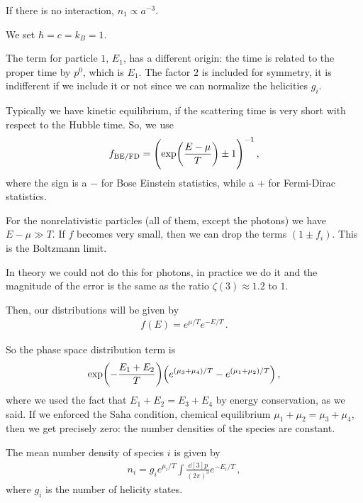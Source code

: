 \documentclass[main.tex]{subfiles}
\begin{document}
If there is no interaction, \(n_1 \propto a^{-3}\). 

We set \(\hbar = c = k_B = 1\).


The term for particle \(1\), \(E_1\), has a different origin: the time is related to the proper time by \(p^{0}\), which is \(E_1\). The factor \(2\) is included for symmetry, it is indifferent if we include it or not since we can normalize the helicities \(g_{i}\). 

Typically we have kinetic equilibrium, if the scattering time is very short with respect to the Hubble time. 
So, we use 
%
\begin{align}
f_{\text{BE/FD}} = \qty(\exp(\frac{E- \mu }{T}) \pm 1)^{-1}
\,,
\end{align}
%
where the sign is a \(-\) for Bose Einstein statistics, while a \(+\) for Fermi-Dirac statistics. 

For the nonrelativistic particles (all of them, except the photons) we have \(E - \mu \gg T\). 
If \(f\) becomes very small, then we can drop the terms \((1 \pm f_i)\). This is the Boltzmann limit. 

In theory we could not do this for photons, in practice we do it and the magnitude of the error is the same as the ratio \(\zeta (3) \approx 1.2\) to \(1\). 

Then, our distributions will be given by 
%
\begin{align}
f(E) = e^{ \mu / T} e^{- E/ T}
\,.
\end{align}

So the phase space distribution term is 
%
\begin{align}
\exp(- \frac{E_1 + E_2 }{T} ) \qty(e^{(\mu_3 + \mu_4 ) / T} - e^{(\mu_1 + \mu_2 ) / T})
\,,
\end{align}
%
where we used the fact that \(E_1 + E_2 = E_3 + E_4 \) by energy conservation, as we said. 
If we enforced the Saha condition, chemical equilibrium \(\mu_1 + \mu_2 = \mu_3 + \mu_4 \), then we get precisely zero: the number densities of the species are constant.

The mean number density of species \(i\) is given by 
%
\begin{align}
n_i = g_i e^{\mu_{i} / T} \int \frac{ \dd[3]{p} }{(2 \pi )^3} e^{-E_i / T}
\,,
\end{align}
%
where \(g_i\) is the number of helicity states. 
\end{document}
